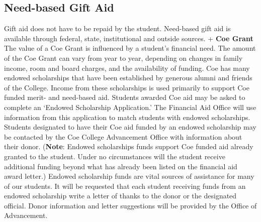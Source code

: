 \documentclass[
  letterpaper,
]{scrbook}
\begin{document}
\hypertarget{need-based-gift-aid}{%
\subsection{Need-based Gift Aid}\label{need-based-gift-aid}}

Gift aid does not have to be repaid by the student. Need-based gift aid
is available through federal, state, institutional and outside sources.
+ \textbf{Coe Grant} The value of a Coe Grant is influenced by a
student's financial need. The amount of the Coe Grant can vary from year
to year, depending on changes in family income, room and board charges,
and the availability of funding. Coe has many endowed scholarships that
have been established by generous alumni and friends of the College.
Income from these scholarships is used primarily to support Coe funded
merit- and need-based aid. Students awarded Coe aid may be asked to
complete an `Endowed Scholarship Application.' The Financial Aid Office
will use information from this application to match students with
endowed scholarships. Students designated to have their Coe aid funded
by an endowed scholarship may be contacted by the Coe College
Advancement Office with information about their donor. (\textbf{Note}:
Endowed scholarships funds support Coe funded aid already granted to the
student. Under no circumstances will the student receive additional
funding beyond what has already been listed on the financial aid award
letter.) Endowed scholarship funds are vital sources of assistance for
many of our students. It will be requested that each student receiving
funds from an endowed scholarship write a letter of thanks to the donor
or the designated official. Donor information and letter suggestions
will be provided by the Office of Advancement.
\end{document}
